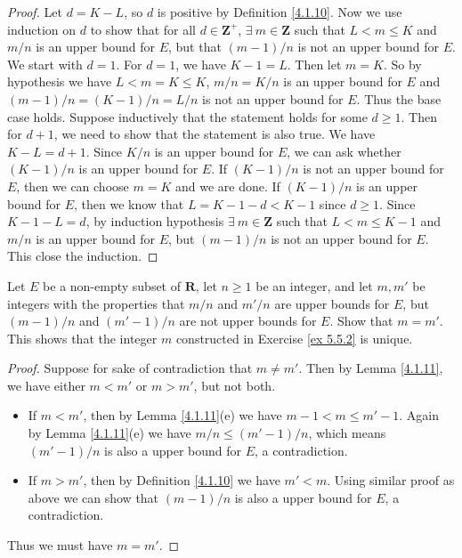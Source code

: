 \begin{proof}
    Let \(d = K - L\), so \(d\) is positive by Definition \ref{4.1.10}.
    Now we use induction on \(d\) to show that for all \(d \in \mathbf{Z}^+\), \(\exists\ m \in \mathbf{Z}\) such that \(L < m \leq K\) and \(m / n\) is an upper bound for \(E\), but that \((m - 1) / n\) is not an upper bound for \(E\).
    We start with \(d = 1\).
    For \(d = 1\), we have \(K - 1 = L\).
    Then let \(m = K\).
    So by hypothesis we have \(L < m = K \leq K\), \(m / n = K / n\) is an upper bound for \(E\) and \((m - 1) / n = (K - 1) / n = L / n\) is not an upper bound for \(E\).
    Thus the base case holds.
    Suppose inductively that the statement holds for some \(d \geq 1\).
    Then for \(d + 1\), we need to show that the statement is also true.
    We have \(K - L = d + 1\).
    Since \(K / n\) is an upper bound for \(E\), we can ask whether \((K - 1) / n\) is an upper bound for \(E\).
    If \((K - 1) / n\) is not an upper bound for \(E\), then we can choose \(m = K\) and we are done.
    If \((K - 1) / n\) is an upper bound for \(E\), then we know that \(L = K - 1 - d < K - 1\) since \(d \geq 1\).
    Since \(K - 1 - L = d\), by induction hypothesis \(\exists\ m \in \mathbf{Z}\) such that \(L < m \leq K - 1\) and \(m / n\) is an upper bound for \(E\), but \((m - 1) / n\) is not an upper bound for \(E\).
    This close the induction.
\end{proof}

\begin{exercise}\label{ex 5.5.3}
    Let \(E\) be a non-empty subset of \(\mathbf{R}\), let \(n \geq 1\) be an integer, and let \(m, m'\) be integers with the properties that \(m / n\) and \(m' / n\) are upper bounds for \(E\), but \((m - 1) / n\) and \((m' - 1) / n\) are not upper bounds for \(E\).
    Show that \(m = m'\).
    This shows that the integer \(m\) constructed in Exercise \ref{ex 5.5.2} is unique.
\end{exercise}

\begin{proof}
    Suppose for sake of contradiction that \(m \neq m'\).
    Then by Lemma \ref{4.1.11}, we have either \(m < m'\) or \(m > m'\), but not both.
    \begin{itemize}
        \item If \(m < m'\), then by Lemma \ref{4.1.11}(e) we have \(m - 1 < m \leq m' - 1\).
              Again by Lemma \ref{4.1.11}(e) we have \(m / n \leq (m' - 1) / n\), which means \((m' - 1) / n\) is also a upper bound for \(E\), a contradiction.
        \item If \(m > m'\), then by Definition \ref{4.1.10} we have \(m' < m\).
              Using similar proof as above we can show that \((m - 1) / n\) is also a upper bound for \(E\), a contradiction.
    \end{itemize}
    Thus we must have \(m = m'\).
\end{proof}

